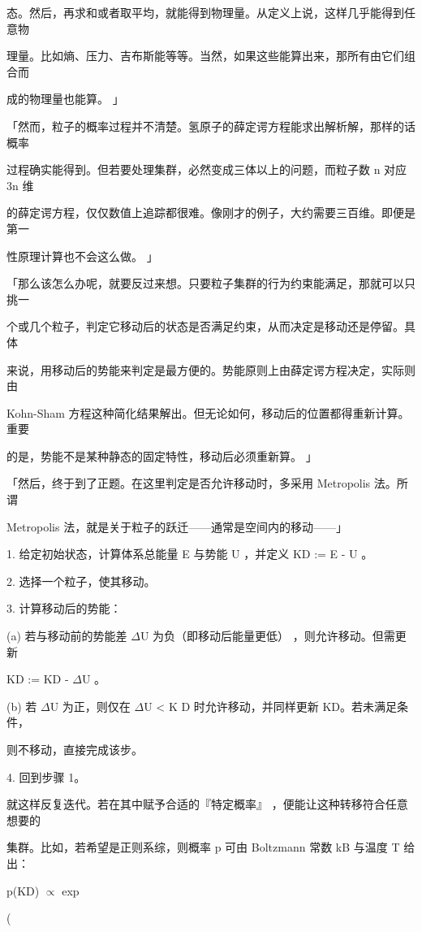 态。然后，再求和或者取平均，就能得到物理量。从定义上说，这样几乎能得到任意物\par
理量。比如熵、压力、吉布斯能等等。当然，如果这些能算出来，那所有由它们组合而\par
成的物理量也能算。 」\par
「然而，粒子的概率过程并不清楚。氢原子的薛定谔方程能求出解析解，那样的话概率\par
过程确实能得到。但若要处理集群，必然变成三体以上的问题，而粒子数 n 对应 3n 维\par
的薛定谔方程，仅仅数值上追踪都很难。像刚才的例子，大约需要三百维。即便是第一\par
性原理计算也不会这么做。 」\par
「那么该怎么办呢，就要反过来想。只要粒子集群的行为约束能满足，那就可以只挑一\par
个或几个粒子，判定它移动后的状态是否满足约束，从而决定是移动还是停留。具体\par
来说，用移动后的势能来判定是最方便的。势能原则上由薛定谔方程决定，实际则由\par
Kohn-Sham 方程这种简化结果解出。但无论如何，移动后的位置都得重新计算。重要\par
的是，势能不是某种静态的固定特性，移动后必须重新算。 」\par
「然后，终于到了正题。在这里判定是否允许移动时，多采用 Metropolis 法。所谓\par
Metropolis 法，就是关于粒子的跃迁——通常是空间内的移动——」\par
1. 给定初始状态，计算体系总能量 E 与势能 U ，并定义 KD := E - U 。\par
2. 选择一个粒子，使其移动。\par
3. 计算移动后的势能：\par
(a) 若与移动前的势能差 $\Delta$U 为负（即移动后能量更低） ，则允许移动。但需更新\par
KD := KD - $\Delta$U 。\par
(b) 若 $\Delta$U 为正，则仅在 $\Delta$U < K D 时允许移动，并同样更新 KD。若未满足条件，\par
则不移动，直接完成该步。\par
4. 回到步骤 1。\par
就这样反复迭代。若在其中赋予合适的『特定概率』 ，便能让这种转移符合任意想要的\par
集群。比如，若希望是正则系综，则概率 p 可由 Boltzmann 常数 kB 与温度 T 给出：\par
p(KD) $\propto$ exp\par
(\par
